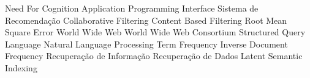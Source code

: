 \begin{acronym}[ACRONYM] 

 {Need For Cognition}
 {Application Programming Interface}
 {Sistema de Recomendação}
 {Collaborative Filtering}
 {Content Based Filtering}
 {Root Mean Square Error}
 {World Wide Web}
 {World Wide Web Consortium}
 {Structured Query Language}
 {Natural Language Processing}
 {Term Frequency Inverse Document Frequency}
 {Recuperação de Informação}
 {Recuperação de Dados}
 {Latent Semantic Indexing}
    
\end{acronym}
